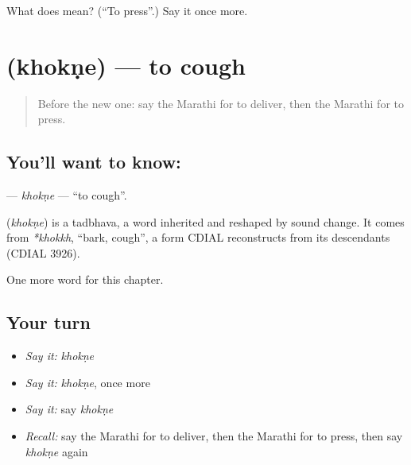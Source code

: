 \begin{tcolorbox}[breakable,colback=teal!4,colframe=teal!35!black,title={Before you move on}]
What does  mean? (\textquotedblleft{}To press\textquotedblright{}.) Say it once more.
\end{tcolorbox}
\section[\texorpdfstring{\mr{खोकणे} (khokṇe)}{खोकणे (khokṇe)}]{ (khokṇe) — to cough}

\label{lesson:MR-C198-khokne}



\begin{quote}
Before the new one: say the Marathi for to deliver, then the Marathi for to press.
\end{quote}

\subsection*{You'll want to know: }
\textbf{} — \emph{khokṇe} — \textquotedblleft{}to cough\textquotedblright{}.

\begin{cousinweb}
\textbf{} (\emph{khokṇe}) is a tadbhava, a word inherited and reshaped by sound change. It comes from \emph{*khokkh}, \textquotedblleft{}bark, cough\textquotedblright{}, a form CDIAL reconstructs from its descendants (CDIAL 3926).
\end{cousinweb}

\begin{grammarlens}[title={What you've built}]
One more word for this chapter.
\end{grammarlens}

\subsection*{Your turn}
\begin{itemize}
\raggedright
  \item \emph{Say it:} \emph{khokṇe}
  \item \emph{Say it:} \emph{khokṇe}, once more
  \item \emph{Say it:} say \emph{khokṇe}
  \item \emph{Recall:} say the Marathi for to deliver, then the Marathi for to press, then say \emph{khokṇe} again
\end{itemize}

